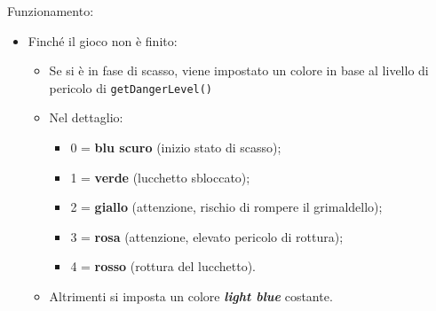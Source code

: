 Funzionamento:
\begin{itemize}
	\item Finché il gioco non è finito:
	\begin{itemize}
		\item Se si è in fase di scasso, viene impostato un colore in base al livello di pericolo di \texttt{getDangerLevel()}
			\item Nel dettaglio:
			\begin{itemize}
				\item 0 = \textbf{blu scuro} (inizio stato di scasso); 
				\item 1 = \textbf{verde} (lucchetto sbloccato);
				\item 2 = \textbf{giallo} (attenzione, rischio di rompere il grimaldello);
				\item 3 = \textbf{rosa} (attenzione, elevato pericolo di rottura);
				\item 4 = \textbf{rosso} (rottura del lucchetto).
			\end{itemize}
		\item Altrimenti si imposta un colore \textbf{\textit{light blue}} costante.
	\end{itemize}
\end{itemize}





